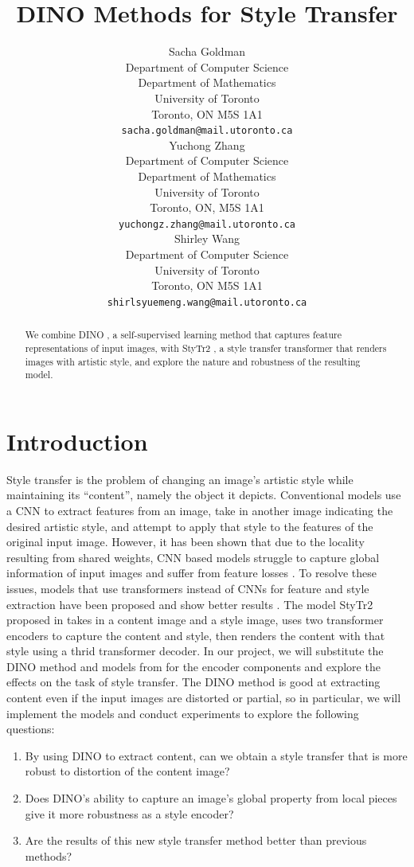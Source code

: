 \documentclass{article}
\title{DINO Methods for Style Transfer}
\author{
	Sacha Goldman \\
	Department of Computer Science\\ 
	Department of Mathematics\\
	University of Toronto\\
	Toronto, ON M5S 1A1 \\
	\texttt{sacha.goldman@mail.utoronto.ca} \\
	\And
	Yuchong Zhang \\
	Department of Computer Science \\
	Department of Mathematics \\
	University of Toronto \\
	Toronto, ON, M5S 1A1 \\
	\texttt{yuchongz.zhang@mail.utoronto.ca} \\
	\And
	Shirley Wang \\
	Department of Computer Science \\
	University of Toronto \\
	Toronto, ON M5S 1A1 \\
	\texttt{shirlsyuemeng.wang@mail.utoronto.ca} \\
}
\begin{document}
\maketitle

\begin{abstract}
We combine DINO \cite{DINO}, a self-supervised learning method that captures feature representations of input images, with StyTr2 \cite{ImageStyleTransformer}, a style transfer transformer that renders images with artistic style, and explore the nature and robustness of the resulting model.
\end{abstract}

\section{Introduction}
Style transfer is the problem of changing an image's artistic style while maintaining its ``content'', namely the object it depicts. Conventional models use a CNN to extract features from an image, take in another image indicating the desired artistic style, and attempt to apply that style to the features of the original input image. However, it has been shown that due to the locality resulting from shared weights, CNN based models struggle to capture global information of input images and suffer from feature losses \cite{ImageStyleTransformer}. To resolve these issues, models that use transformers instead of CNNs for feature and style extraction have been proposed and show better results \cite{ImageStyleTransformer}. The model StyTr2 proposed in \cite{ImageStyleTransformer} takes in a content image and a style image, uses two transformer encoders to capture the content and style, then renders the content with that style using a thrid transformer decoder. In our project, we will substitute the DINO method and models from \cite{DINO} for the encoder components and explore the effects on the task of style transfer. The DINO method is good at extracting content even if the input images are distorted or partial, so in particular, we will implement the models and conduct experiments to explore the following questions:
\begin{enumerate}
	\item By using DINO to extract content, can we obtain a style transfer that is more robust to distortion of the content image?
	\item Does DINO's ability to capture an image's global property from local pieces give it more robustness as a style encoder?
	\item Are the results of this new style transfer method better than previous methods?
\end{enumerate}
\end{document}
